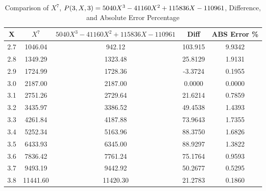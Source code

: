 ﻿%
\begin{table}[h!]
    \centering
    \caption{Comparison of $X^7$, ${P}(3,X,3) = 5040 X^3 - 41160 X^2 + 115836 X - 110961$, Difference, and Absolute Error Percentage}
    \begin{tabular}{|c|c|c|c|c|}
        \hline
        \textbf{X} & \textbf{$X^7$} & \textbf{$5040 X^3 - 41160 X^2 + 115836 X - 110961$} & \textbf{Diff} & \textbf{ABS Error \%} \\ \hline
        2.7        & 1046.04        & 942.12                                              & 103.915       & 9.9342                \\ \hline
        2.8        & 1349.29        & 1323.48                                             & 25.8129       & 1.9131                \\ \hline
        2.9        & 1724.99        & 1728.36                                             & -3.3724       & 0.1955                \\ \hline
        3.0        & 2187.00        & 2187.00                                             & 0.0000        & 0.0000                \\ \hline
        3.1        & 2751.26        & 2729.64                                             & 21.6214       & 0.7859                \\ \hline
        3.2        & 3435.97        & 3386.52                                             & 49.4538       & 1.4393                \\ \hline
        3.3        & 4261.84        & 4187.88                                             & 73.9643       & 1.7355                \\ \hline
        3.4        & 5252.34        & 5163.96                                             & 88.3750       & 1.6826                \\ \hline
        3.5        & 6433.93        & 6345.00                                             & 88.9297       & 1.3822                \\ \hline
        3.6        & 7836.42        & 7761.24                                             & 75.1764       & 0.9593                \\ \hline
        3.7        & 9493.19        & 9442.92                                             & 50.2677       & 0.5295                \\ \hline
        3.8        & 11441.60       & 11420.30                                            & 21.2783       & 0.1860                \\ \hline

\end{tabular}
\end{table}
